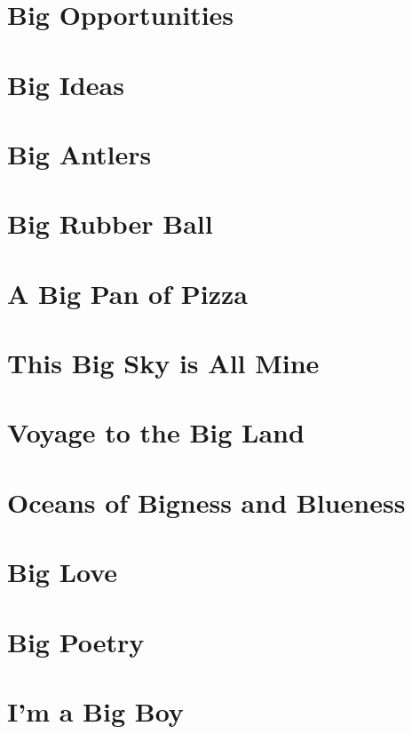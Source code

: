 \chapter{Big Opportunities}


\chapter{Big Ideas}


\chapter{Big Antlers}


\chapter{Big Rubber Ball}


\chapter{A Big Pan of Pizza}


\chapter{This Big Sky is All Mine}


\chapter{Voyage to the Big Land}


\chapter{Oceans of Bigness and Blueness}


\chapter{Big Love}


\chapter{Big Poetry}


\chapter{I'm a Big Boy}
